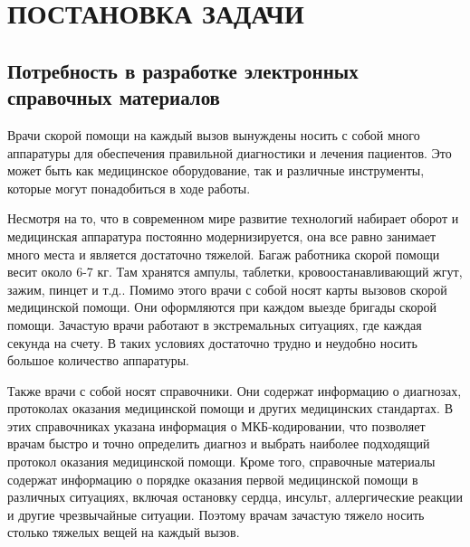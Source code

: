 \section{ПОСТАНОВКА ЗАДАЧИ}

\subsection{Потребность в разработке электронных справочных материалов}

Врачи скорой помощи на каждый вызов вынуждены носить с собой много аппаратуры для обеспечения правильной диагностики и лечения пациентов. Это может быть как медицинское оборудование, так и различные инструменты, которые могут понадобиться в ходе работы. 


Несмотря на то, что в современном мире развитие технологий набирает оборот и медицинская аппаратура постоянно модернизируется, она все равно занимает много места и является достаточно тяжелой. Багаж работника скорой помощи весит около 6-7 кг. Там хранятся ампулы, таблетки, кровоостанавливающий жгут, зажим, пинцет и т.д.. Помимо этого врачи с собой носят карты вызовов скорой медицинской помощи. Они оформляются при каждом выезде бригады скорой помощи. Зачастую врачи работают в экстремальных ситуациях, где каждая секунда на счету. В таких условиях достаточно трудно и неудобно носить большое количество аппаратуры.


Также врачи с собой носят справочники. Они содержат информацию о диагнозах, протоколах оказания медицинской помощи и других медицинских стандартах. В этих справочниках указана информация о МКБ-кодировании, что позволяет врачам быстро и точно определить диагноз и выбрать наиболее подходящий протокол оказания медицинской помощи. Кроме того, справочные материалы содержат информацию о порядке оказания первой медицинской помощи в различных ситуациях, включая остановку сердца, инсульт, аллергические реакции и другие чрезвычайные ситуации. Поэтому врачам зачастую тяжело носить столько тяжелых вещей на каждый вызов.


